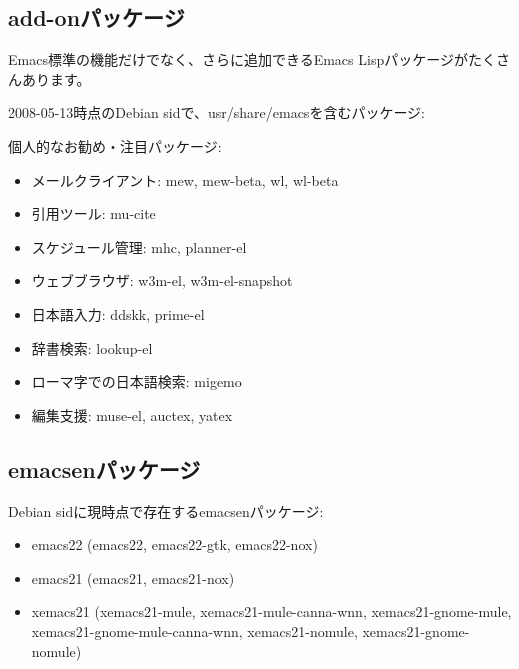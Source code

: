 \documentclass[mingoth,a4paper]{jsarticle}
\begin{document}
\subsection{add-onパッケージ}

Emacs標準の機能だけでなく、さらに追加できるEmacs Lispパッケージがたくさんあります。

2008-05-13時点のDebian sidで、usr/share/emacsを含むパッケージ:


個人的なお勧め・注目パッケージ:

\begin{itemize}
 \item メールクライアント: mew, mew-beta, wl, wl-beta
 \item 引用ツール: mu-cite
 \item スケジュール管理: mhc, planner-el
 \item ウェブブラウザ: w3m-el, w3m-el-snapshot
 \item 日本語入力: ddskk, prime-el
 \item 辞書検索: lookup-el
 \item ローマ字での日本語検索: migemo
 \item 編集支援: muse-el, auctex, yatex
\end{itemize}

\subsection{emacsenパッケージ}

Debian sidに現時点で存在するemacsenパッケージ:

\begin{itemize}
 \item emacs22 (emacs22, emacs22-gtk, emacs22-nox)
 \item emacs21 (emacs21, emacs21-nox)
 \item xemacs21 (xemacs21-mule, xemacs21-mule-canna-wnn, xemacs21-gnome-mule,\\
       xemacs21-gnome-mule-canna-wnn, xemacs21-nomule, xemacs21-gnome-nomule)
\end{itemize}
\end{document}
